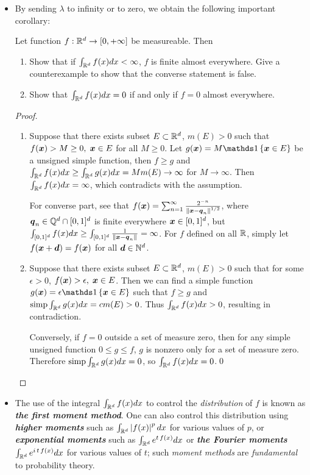 \documentclass[11pt]{article}
\begin{document}
\begin{itemize}
\item By sending $\lambda$ to infinity or to zero, we obtain the following important corollary:
\begin{exercise}
Let function $f: {\mathbb R}^{d} \rightarrow [0,+\infty]$ be measureable. Then
\begin{enumerate}
\item Show that if $\int_{{\mathbb R}^{d}}f(x)dx<\infty$, $f$ is finite almost everywhere. Give a counterexample to show that the converse statement is false.
\item Show that $\int_{{\mathbb R}^{d}}f(x)dx= 0$ if and only if $f=0$ almost everywhere.
\end{enumerate}
\end{exercise}
\begin{proof}
\begin{enumerate}
\item Suppose that there exists subset $E\subset {\mathbb R}^{d}$, $m(E)>0$ such that $f(\boldsymbol{x})> M\ge 0,\; \boldsymbol{x}\in E$ for all $M\ge 0$. Let $g(\mb{x})= M\ind{\mb{x}\in E}$ be a unsigned simple function, then $f\ge g$ and $\int_{{\mathbb R}^{d}}f(x)dx \ge \int_{{\mathbb R}^{d}}g(x)dx =M m(E)\rightarrow \infty$ for $M\rightarrow \infty$. Then $\int_{{\mathbb R}^{d}}f(x)dx=\infty$, which contradicts with the assumption. 

For converse part, see that $f(\boldsymbol{x})= \sum_{n=1}^{\infty}\frac{2^{-n}}{\left\|\boldsymbol{x}- \boldsymbol{q}_{n}\right\|_{}^{1/2}}$, where $\boldsymbol{q}_{n}\in {\mathbb Q}^{d}\cap [0,1]^{d}$ is finite everywhere $\boldsymbol{x}\in [0,1]^{d}$, but $\int_{[0,1]^{d}}f(x)dx \ge\int_{[0,1]^{d}}\frac{1}{\left\|\boldsymbol{x}- \boldsymbol{q}_{n}\right\|_{}}  = \infty$. For $f$ defined on all ${\mathbb R}$, simply let $f(\boldsymbol{x}+\boldsymbol{d}) = f(\boldsymbol{x})$ for all $\boldsymbol{d}\in {\mathbb N}^{d}$.


\item Suppose that there exists subset $E\subset {\mathbb R}^{d}$, $m(E)>0$ such that for some $\epsilon>0$,  $f(\boldsymbol{x})> \epsilon,\; \boldsymbol{x}\in E$. Then we can find a simple function $g(\mb{x})= \epsilon\ind{\mb{x}\in E}$ such that $f\ge g$ and $\text{simp}\int_{{\mathbb R}^{d}}g(x)dx= c m(E)>0$. Thus $\int_{{\mathbb R}^{d}}f(x)dx>0$, resulting in contradiction.

Conversely, if $f=0$ outside a set of measure zero, then for any simple unsigned function $0\le g\le f$, $g$ is nonzero only for a set of measure zero. Therefore $\text{simp}\int_{{\mathbb R}^{d}}g(x)dx= 0$, so $\int_{{\mathbb R}^{d}}f(x)dx=0$.\qed
\end{enumerate}
\end{proof}

\item \begin{remark}
The use of the integral $\int_{{\mathbb R}^{d}}f(x)dx$ to control the \emph{distribution} of $f$ is known as \emph{\textbf{the first moment method}}. One can also control this distribution using \emph{\textbf{higher moments}} such as $\int_{{\mathbb R}^{d}}\left\lvert f(x) \right\rvert^p dx$ for various values of $p$, or \emph{\textbf{exponential moments}} such as $\int_{{\mathbb R}^{d}}e^{t\,f(x)}dx$ or \emph{\textbf{the Fourier moments}} $\int_{{\mathbb R}^{d}}e^{i\,t\,f(x)}dx$ for various values of $t$; such \emph{moment methods} are \emph{fundamental} to probability theory.
\end{remark}
\end{itemize}
\end{document}
